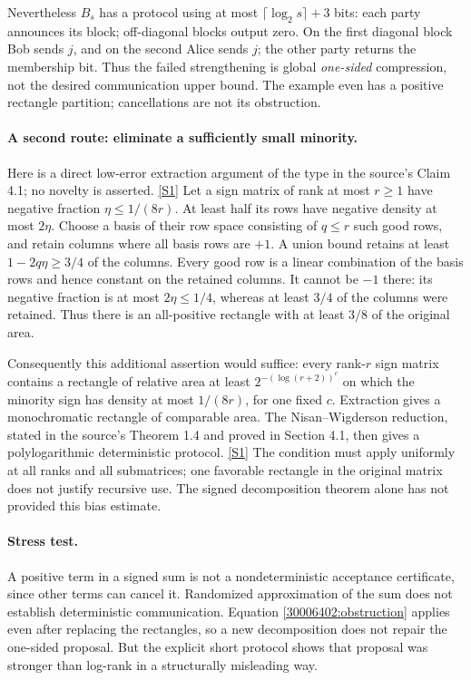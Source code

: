 \documentclass[11pt,a4paper]{article}
\newcommand{\sref}[2]{\hyperlink{source:#1:#2}{[S#2]}}
\numberwithin{equation}{section}
\begin{document}
Nevertheless $B_s$ has a protocol using at most
$\lceil\log_2s\rceil+3$ bits: each party announces its block; off-diagonal
blocks output zero. On the first diagonal block Bob sends $j$, and on the
second Alice sends $j$; the other party returns the membership bit.
Thus the failed strengthening is global \emph{one-sided} compression,
not the desired communication upper bound. The example even has a positive
rectangle partition; cancellations are not its obstruction.

\paragraph{A second route: eliminate a sufficiently small minority.}
Here is a direct low-error extraction argument of the type in the source's
Claim 4.1; no novelty is asserted. \sref{30006402}{1} Let a sign matrix of rank
at most $r\ge1$ have negative fraction $\eta\le1/(8r)$. At least half its
rows have negative density at most $2\eta$. Choose a basis of their row
space consisting of $q\le r$ such good rows, and retain columns where all
basis rows are $+1$. A union bound retains at least
$1-2q\eta\ge3/4$ of the columns. Every good row is a linear combination
of the basis rows and hence constant on the retained columns. It cannot be
$-1$ there: its negative fraction is at most $2\eta\le1/4$, whereas at
least $3/4$ of the columns were retained. Thus there is an all-positive
rectangle with at least $3/8$ of the original area.

Consequently this additional assertion would suffice: every rank-$r$ sign
matrix contains a rectangle of relative area at least
$2^{-(\log(r+2))^c}$ on which the minority sign has density at most $1/(8r)$,
for one fixed $c$. Extraction gives a monochromatic rectangle of comparable
area. The Nisan--Wigderson reduction, stated in the source's Theorem 1.4
and proved in Section 4.1, then gives a polylogarithmic deterministic
protocol. \sref{30006402}{1} The condition must apply uniformly at all ranks and
all submatrices; one favorable rectangle in the original matrix does not
justify recursive use. The signed decomposition theorem alone has not
provided this bias estimate.

\paragraph{Stress test.}
A positive term in a signed sum is not a nondeterministic acceptance
certificate, since other terms can cancel it. Randomized approximation of
the sum does not establish deterministic communication. Equation
\eqref{30006402:obstruction} applies even after replacing the rectangles, so a
new decomposition does not repair the one-sided proposal. But the explicit
short protocol shows that proposal was stronger than log-rank in a
structurally misleading way.
\end{document}
